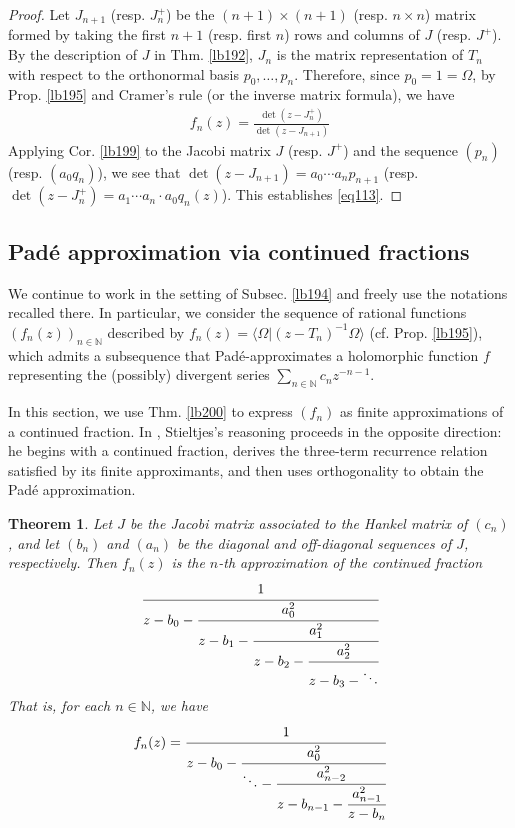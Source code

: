 \documentclass[12pt,b5paper,notitlepage]{article}
\theoremstyle{definition}
\theoremstyle{plain}
\newtheorem{thm}[df]{Theorem}
\newcommand{\bk}[1]{\langle {#1}\rangle}
\newcommand{\Nbb}{\mathbb N}
\numberwithin{equation}{section}
\begin{document}
\begin{proof}
Let $J_{n+1}$ (resp. $J^+_n$) be the $(n+1)\times (n+1)$ (resp. $n\times n$)  matrix formed by taking the first $n+1$ (resp. first $n$) rows and columns of $J$ (resp. $J^+$). By the description of $J$ in Thm. \ref{lb192}, $J_n$ is the matrix representation of $T_n$ with respect to the orthonormal basis $p_0,\dots,p_n$. Therefore, since $p_0=1=\Omega$, by Prop. \ref{lb195} and Cramer's rule (or the inverse matrix formula), we have
\begin{align}
f_n(z)=\frac{\det(z-J^+_n)}{\det(z-J_{n+1})}
\end{align}
Applying Cor. \ref{lb199} to the Jacobi matrix $J$ (resp. $J^+$) and the sequence $(p_n)$ (resp. $(a_0q_n)$), we see that $\det(z-J_{n+1})=a_0\cdots a_np_{n+1}$ (resp. $\det(z-J^+_n)=a_1\cdots a_n\cdot a_0 q_n(z)$). This establishes \eqref{eq113}.
\end{proof}





\subsection{Pad\'e approximation via continued fractions}\label{lb453}



We continue to work in the setting of Subsec. \ref{lb194} and freely use the notations recalled there. In particular, we consider the sequence of rational functions $(f_n(z))_{n\in\Nbb}$ described by $f_n(z)=\bk{\Omega|(z-T_n)^{-1}\Omega}$ (cf. Prop. \ref{lb195}), which admits a subsequence that Pad\'e-approximates a holomorphic function $f$ representing the (possibly) divergent series $\sum_{n\in\Nbb}c_nz^{-n-1}$. 

In this section, we use Thm. \ref{lb200} to express $(f_n)$ as finite approximations of a continued fraction. In \cite{Sti94}, Stieltjes's reasoning proceeds in the opposite direction: he begins with a continued fraction, derives the three-term recurrence relation satisfied by its finite approximants, and then uses orthogonality to obtain the Pad\'e approximation.

\begin{thm}\label{lb454}
Let $J$ be the Jacobi matrix associated to the Hankel matrix of $(c_n)$, and let $(b_n)$ and $(a_n)$ be the diagonal and off-diagonal sequences of $J$, respectively. Then $f_n(z)$ is the $n$-th approximation of the continued fraction
\begin{align*}
\cfrac{1}{z-b_0-\cfrac{a_0^2}{z-b_1-\cfrac{a_1^2}{z-b_2-\cfrac{a_2^2}{z-b_3-\ddots}  } } }
\end{align*}
That is, for each $n\in\Nbb$, we have
\begin{align}\label{eq115}
f_n(z)=\cfrac{1}{z-b_0-\cfrac{a_0^2}{\ddots-\cfrac{a_{n-2}^2}{z-b_{n-1}-\cfrac{a_{n-1}^2}{z-b_n} } } }
\end{align}
\end{thm}
\end{document}
